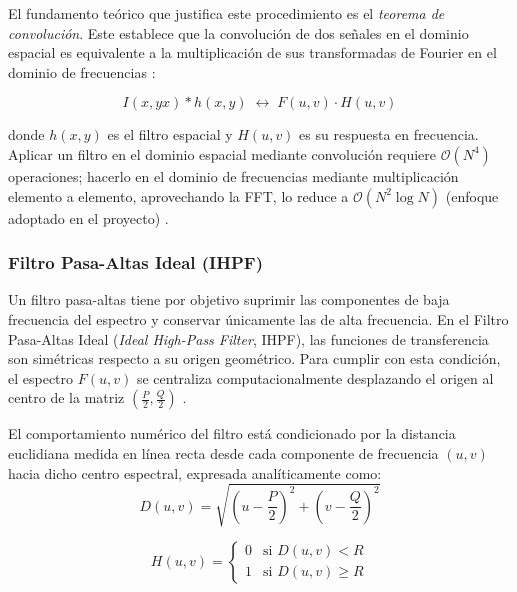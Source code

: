 \documentclass[conference]{IEEEtran}
\begin{document}
El fundamento teórico que justifica este procedimiento es el \textit{teorema de convolución}. Este establece que la convolución de dos señales en el dominio espacial es equivalente a la multiplicación de sus
transformadas de Fourier en el dominio de frecuencias \cite{oppenheim2010}:

\begin{equation}
    I(x,yx) * h(x,y) \;\longleftrightarrow\; F(u,v) \cdot H(u,v)
    \label{eq:convolucion}
\end{equation}

donde $h(x,y)$ es el filtro espacial y $H(u,v)$ es su respuesta en frecuencia. Aplicar un filtro en el dominio espacial mediante convolución requiere $\mathcal{O}(N^4)$ operaciones; hacerlo en el dominio de frecuencias mediante multiplicación elemento a elemento, aprovechando la FFT, lo reduce a
$\mathcal{O}(N^2 \log N)$ (enfoque adoptado en el proyecto) \cite{gonzalez2018}.

\subsubsection{Filtro Pasa-Altas Ideal (IHPF)}

Un filtro pasa-altas tiene por objetivo suprimir las componentes de baja frecuencia del espectro y conservar únicamente las de alta frecuencia. En el Filtro Pasa-Altas Ideal (\textit{Ideal High-Pass Filter}, IHPF), las funciones de transferencia son simétricas respecto a su origen geométrico. Para cumplir con esta condición, el espectro $F(u,v)$ se centraliza computacionalmente desplazando el origen al centro de la matriz $\left(\frac{P}{2}, \frac{Q}{2}\right)$ \cite{gonzalez2018}.

El comportamiento numérico del filtro está condicionado por la distancia euclidiana medida en línea recta desde cada componente de frecuencia $(u,v)$ hacia dicho centro espectral, expresada analíticamente como:
\begin{equation}
    D(u,v) = \sqrt{\left(u - \frac{P}{2}\right)^2 + \left(v - \frac{Q}{2}\right)^2}
    \label{eq:distancia}
\end{equation}

\begin{equation}
    H(u,v) = \begin{cases}
        0 & \text{si } D(u,v) < R \\
        1 & \text{si } D(u,v) \geq R
    \end{cases}
    \label{eq:ihpf}
\end{equation}
\end{document}
